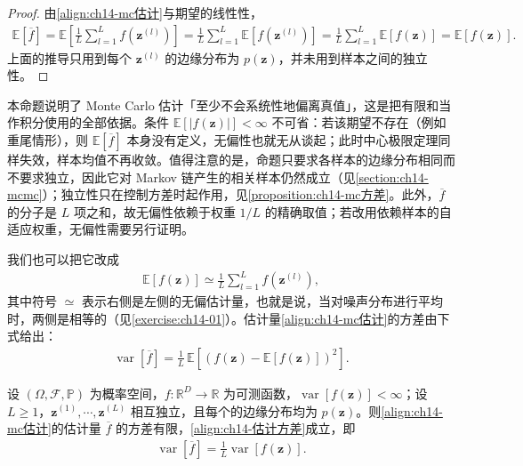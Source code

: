 \documentclass[../../main.tex]{subfiles}
\begin{document}
\begin{proof}
由\eqref{align:ch14-mc估计}与期望的线性性，
\begin{align*}
\mathbb{E}\left[\overline{f}\right]=\mathbb{E}\left[\frac{1}{L}\sum_{l=1}^{L}f\!\left(\bm{z}^{(l)}\right)\right]=\frac{1}{L}\sum_{l=1}^{L}\mathbb{E}\left[f\!\left(\bm{z}^{(l)}\right)\right]=\frac{1}{L}\sum_{l=1}^{L}\mathbb{E}[f(\bm{z})]=\mathbb{E}[f(\bm{z})].
\end{align*}
上面的推导只用到每个 $\bm{z}^{(l)}$ 的边缘分布为 $p(\bm{z})$，并未用到样本之间的独立性。
\end{proof}

\begin{remark}本命题说明了 Monte Carlo 估计「至少不会系统性地偏离真值」，这是把有限和当作积分使用的全部依据。条件 $\mathbb{E}[|f(\bm{z})|]<\infty$ 不可省：若该期望不存在（例如重尾情形），则 $\mathbb{E}[\overline{f}]$ 本身没有定义，无偏性也就无从谈起；此时中心极限定理同样失效，样本均值不再收敛。值得注意的是，命题只要求各样本的边缘分布相同而不要求独立，因此它对 Markov 链产生的相关样本仍然成立（见\cref{section:ch14-mcmc}）；独立性只在控制方差时起作用，见\cref{proposition:ch14-mc方差}。此外，$\overline{f}$ 的分子是 $L$ 项之和，故无偏性依赖于权重 $1/L$ 的精确取值；若改用依赖样本的自适应权重，无偏性需要另行证明。
\end{remark}

我们也可以把它改成
\begin{align}
\mathbb{E}[f(\bm{z})]\simeq\frac{1}{L}\sum_{l=1}^{L}f\!\left(\bm{z}^{(l)}\right),
\label{align:ch14-无偏近似}
\end{align}
其中符号 $\simeq$ 表示右侧是左侧的无偏估计量，也就是说，当对噪声分布进行平均时，两侧是相等的（见\cref{exercise:ch14-01}）。估计量\eqref{align:ch14-mc估计}的方差由下式给出：
\begin{align}
\operatorname{var}\left[\overline{f}\right]=\frac{1}{L}\,\mathbb{E}\left[\left(f(\bm{z})-\mathbb{E}[f(\bm{z})]\right)^{2}\right].
\label{align:ch14-估计方差}
\end{align}

\begin{proposition}\label{proposition:ch14-mc方差}
设 $(\Omega,\mathcal{F},\mathbb{P})$ 为概率空间，$f:\mathbb{R}^{D}\to\mathbb{R}$ 为可测函数，$\operatorname{var}[f(\bm{z})]<\infty$；设 $L\geqslant1$，$\bm{z}^{(1)},\cdots,\bm{z}^{(L)}$ 相互独立，且每个的边缘分布均为 $p(\bm{z})$。则\eqref{align:ch14-mc估计}的估计量 $\overline{f}$ 的方差有限，\eqref{align:ch14-估计方差}成立，即
\begin{align}
\operatorname{var}\left[\overline{f}\right]=\frac{1}{L}\operatorname{var}[f(\bm{z})].
\label{align:ch14-方差iid}
\end{align}
\end{proposition}
\end{document}
